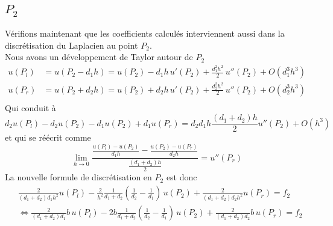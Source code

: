 \documentclass[11pt,a4paper]{article}
\begin{document}
\subsection{$P_2$}
Vérifions maintenant que les coefficients calculés interviennent aussi dans la discrétisation du Laplacien au point $P_2$.\\
Nous avons un développement de Taylor autour de $P_2$
\begin{align*}
u (P_l) &= u \left(P_2-d_1h\right) = u \left(P_2\right) - d_1h\,u'\left(P_2\right) + \frac{d_1^2h^2}{2}\,u''\left(P_2\right) + O\left(d_1^3h^3\right)\\
u \left(P_r\right) &= u \left(P_2+d_2h\right) = u \left(P_2\right) + d_2h\,u'\left(P_2\right) + \frac{d_2^2h^2}{2}\,u''(P_2) + O\left(d_2^3h^3\right)\\
\end{align*}
Qui conduit à
\begin{equation}
d_2u \left(P_l\right) - d_2u\left(P_2\right) - d_1u\left(P_2\right) + d_1 u (P_r) = d_2d_1h\frac{(d_1+d_2)h}{2}u''\left(P_2\right) + O(h^3)
\end{equation}
et qui se réécrit comme
\begin{equation}
\lim_{h\to0}\frac{\frac{u(P_l)- u (P_2)}{d_1h} - \frac{u (P_2) - u (P_r)}{d_2h}}{\frac{(d_1+d_2)h}{2}} = u''(P_r)
\end{equation}
La nouvelle formule de discrétisation en $P_2$ est donc
\begin{align*}
& \frac{2}{(d_1 + d_2)d_1h^2}u(P_l) - \frac{2}{h^2}\frac{1}{d_1 + d_2}\left(\frac{1}{d_2} - \frac{1}{d_1}\right)\,u(P_2) + \frac{2}{(d_1 + d_2)d_2h^2}u(P_r) = f_2\\
& \Longleftrightarrow \frac{2}{(d_1+d_2)d_1}b\,u(P_l) - 2b\frac{1}{d_1 + d_2}\left(\frac{1}{d_2} - \frac{1}{d_1}\right)\,u(P_2) + \frac{2}{(d_1+d_2)d_2}b\,u(P_r) = f_2
\end{align*}
\end{document}
